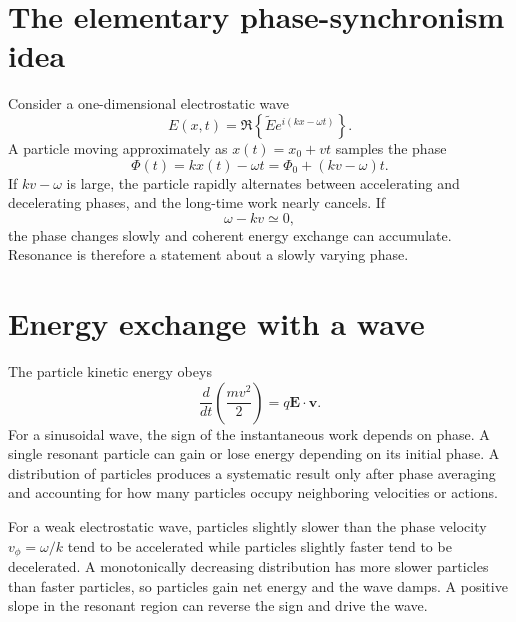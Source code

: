 \documentclass[11pt]{article}
\begin{document}
\section{The elementary phase-synchronism idea}
Consider a one-dimensional electrostatic wave
\begin{equation}
E(x,t)=\Re\!\left\{\widetilde E e^{i(kx-\omega t)}\right\}.
\end{equation}
A particle moving approximately as $x(t)=x_0+vt$ samples the phase
\begin{equation}
\Phi(t)=kx(t)-\omega t=\Phi_0+(kv-\omega)t.
\end{equation}
If $kv-\omega$ is large, the particle rapidly alternates between accelerating and decelerating phases, and the long-time work nearly cancels. If
\begin{equation}
\boxed{\omega-kv\simeq0},
\end{equation}
the phase changes slowly and coherent energy exchange can accumulate. Resonance is therefore a statement about a slowly varying phase.

\section{Energy exchange with a wave}
The particle kinetic energy obeys
\begin{equation}
\frac{d}{dt}\left(\frac{mv^2}{2}\right)=q\mathbf E\cdot\mathbf v.
\end{equation}
For a sinusoidal wave, the sign of the instantaneous work depends on phase. A single resonant particle can gain or lose energy depending on its initial phase. A distribution of particles produces a systematic result only after phase averaging and accounting for how many particles occupy neighboring velocities or actions.

For a weak electrostatic wave, particles slightly slower than the phase velocity $v_\phi=\omega/k$ tend to be accelerated while particles slightly faster tend to be decelerated. A monotonically decreasing distribution has more slower particles than faster particles, so particles gain net energy and the wave damps. A positive slope in the resonant region can reverse the sign and drive the wave.
\end{document}
